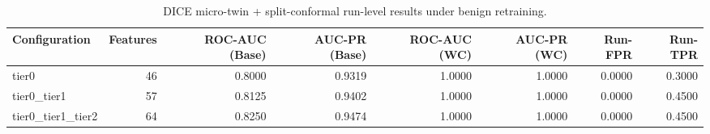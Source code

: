 \begin{table}[t]
\centering
\caption{DICE micro-twin + split-conformal run-level results under benign retraining.}
\label{tab:dice_full_overall}
\footnotesize
\begin{tabular}{lrrrrrrr}
\toprule
Configuration & Features & ROC-AUC (Base) & AUC-PR (Base) & ROC-AUC (WC) & AUC-PR (WC) & Run-FPR & Run-TPR \\
\midrule
tier0 & 46 & 0.8000 & 0.9319 & 1.0000 & 1.0000 & 0.0000 & 0.3000 \\
tier0_tier1 & 57 & 0.8125 & 0.9402 & 1.0000 & 1.0000 & 0.0000 & 0.4500 \\
tier0_tier1_tier2 & 64 & 0.8250 & 0.9474 & 1.0000 & 1.0000 & 0.0000 & 0.4500 \\
\bottomrule
\end{tabular}

\end{table}
